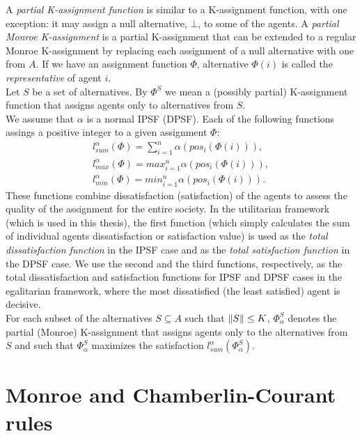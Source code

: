 A \textit{partial K-assignment function} is similar to a K-assignment function, with one exception: it may assign a null alternative, $\bot$, to some of the agents. A \textit{partial Monroe K-assignment} is a partial K-assignment that can be extended to a regular Monroe K-assignment by replacing each assignment of a null alternative with one from $A$. If we have an assignment function $\Phi$, alternative $\Phi(i)$ is called the \textit{representative} of agent $i$.
\\

Let $S$ be a set of alternatives. By $\Phi^{S}$ we mean a (possibly partial) K-assignment function that assigns agents only to alternatives from $S$.
\\

We assume that $\alpha$ is a normal IPSF (DPSF). Each of the following functions assings a positive integer to a given assignment $\Phi$:
\begin{gather}
	l^{\alpha}_{sum}(\Phi) = \sum^{n}_{i=1} \alpha (pos_{i}(\Phi(i))),\\
	l^{\alpha}_{max}(\Phi) = max^{n}_{i=1} \alpha (pos_{i}(\Phi(i))),\\
	l^{\alpha}_{min}(\Phi) = min^{n}_{i=1} \alpha (pos_{i}(\Phi(i))).
\end{gather}
These functions combine dissatisfaction (satisfaction) of the agents to assess the quality of the assignment for the entire society. In the utilitarian framework (which is used in this thesis), the first function (which simply calculates the sum of individual agents dissatisfaction or satisfaction value) is used as the \textit{total dissatisfaction function} in the IPSF case and as the \textit{total satisfaction function} in the DPSF case. We use the second and the third functions, respectively, as the total dissatisfaction and satisfaction functions for IPSF and DPSF cases in the egalitarian framework, where the most dissatisfied (the least satisfied) agent is decisive.
\\

For each subset of the alternatives $S \subseteq A$ such that $\lVert S\rVert \leq K$, $\Phi^{S}_{\alpha}$ denotes the partial (Monroe) K-assignment that assigns agents only to the alternatives from $S$ and such that $\Phi^{S}_{\alpha}$ maximizes the satisfaction $l^{\alpha}_{sum}(\Phi^{S}_{\alpha})$.

\section{Monroe and Chamberlin-Courant rules}

